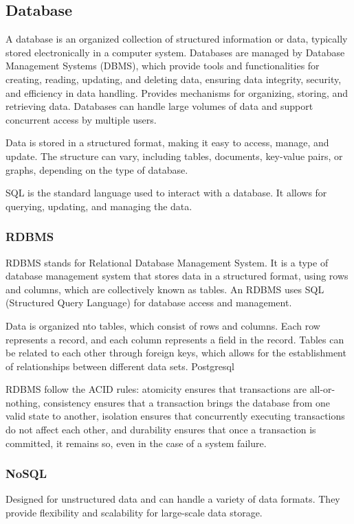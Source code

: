 \subsection{Database}
    A database is an organized collection of structured information or data, typically stored electronically in a computer system. Databases are managed by Database Management Systems (DBMS), which provide tools and functionalities for creating, reading, updating, and deleting data, ensuring data integrity, security, and efficiency in data handling. Provides mechanisms for organizing, storing, and retrieving data. Databases can handle large volumes of data and support concurrent access by multiple users.

    Data is stored in a structured format, making it easy to access, manage, and update. The structure can vary, including tables, documents, key-value pairs, or graphs, depending on the type of database.
    
    SQL is the standard language used to interact with a database. It allows for querying, updating, and managing the data.

    \subsubsection{RDBMS}
    RDBMS stands for Relational Database Management System. It is a type of database management system that stores data in a structured format, using rows and columns, which are collectively known as tables. An RDBMS uses SQL (Structured Query Language) for database access and management.

    Data is organized nto tables, which consist of rows and columns. Each row represents a record, and each column represents a field in the record. Tables can be related to each other through foreign keys, which allows for the establishment of relationships between different data sets.
    Postgresql
    
    RDBMS follow the ACID rules: atomicity ensures that transactions are all-or-nothing, consistency ensures that a transaction brings the database from one valid state to another, isolation ensures that concurrently executing transactions do not affect each other, and durability ensures that once a transaction is committed, it remains so, even in the case of a system failure.

    \subsubsection{NoSQL}
    Designed for unstructured data and can handle a variety of data formats. They provide flexibility and scalability for large-scale data storage.
 
